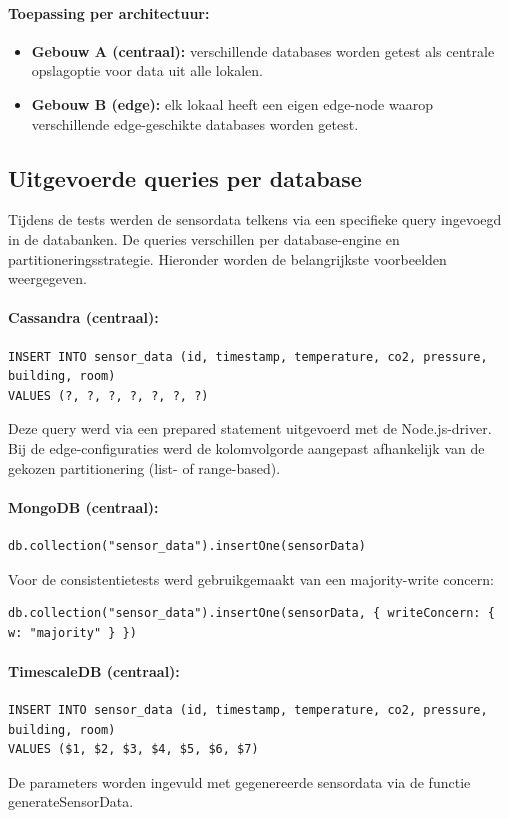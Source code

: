 \paragraph{Toepassing per architectuur:}
\begin{itemize}
    \item \textbf{Gebouw A (centraal):} verschillende databases worden getest als centrale opslagoptie voor data uit alle lokalen.

    \item \textbf{Gebouw B (edge):} elk lokaal heeft een eigen edge-node waarop verschillende edge-geschikte databases worden getest.
\end{itemize}

\subsection{Uitgevoerde queries per database}
Tijdens de tests werden de sensordata telkens via een specifieke query ingevoegd in de databanken. 
De queries verschillen per database-engine en partitioneringsstrategie. Hieronder worden de belangrijkste voorbeelden weergegeven.

\paragraph{Cassandra (centraal):}
\begin{verbatim}
INSERT INTO sensor_data (id, timestamp, temperature, co2, pressure, building, room)
VALUES (?, ?, ?, ?, ?, ?, ?)
\end{verbatim}
Deze query werd via een prepared statement uitgevoerd met de Node.js-driver. 
Bij de edge-configuraties werd de kolomvolgorde aangepast afhankelijk van de gekozen partitionering (list- of range-based).

\paragraph{MongoDB (centraal):}
\begin{verbatim}
db.collection("sensor_data").insertOne(sensorData)
\end{verbatim}
Voor de consistentietests werd gebruikgemaakt van een majority-write concern:
\begin{verbatim}
db.collection("sensor_data").insertOne(sensorData, { writeConcern: { w: "majority" } })
\end{verbatim}

\paragraph{TimescaleDB (centraal):}
\begin{verbatim}
INSERT INTO sensor_data (id, timestamp, temperature, co2, pressure, building, room)
VALUES ($1, $2, $3, $4, $5, $6, $7)
\end{verbatim}
De parameters worden ingevuld met gegenereerde sensordata via de functie generateSensorData.


